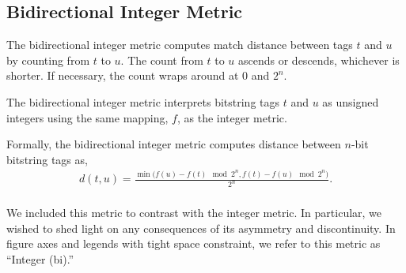 \subsection{Bidirectional Integer Metric} \label{sec:bidirectionalinteger}

The bidirectional integer metric computes match distance between tags $t$ and $u$ by counting from $t$ to $u$.
The count from $t$ to $u$ ascends or descends, whichever is shorter.
If necessary, the count wraps around at $0$ and $2^n$.

The bidirectional integer metric interprets bitstring tags $t$ and $u$ as unsigned integers using the same mapping, $f$, as the integer metric.

Formally, the bidirectional integer metric computes distance between $n$-bit bitstring tags as,
\begin{align*}
d(t, u) =
  \frac{\min \Big(f(u) - f(t)  \mod 2^n, f(t) - f(u) \mod 2^n \Big)}{2^n}. \\
\end{align*}

We included this metric to contrast with the integer metric. In particular, we wished to shed light on any consequences of its asymmetry and discontinuity.
In figure axes and legends with tight space constraint, we refer to this metric as ``Integer (bi).''
